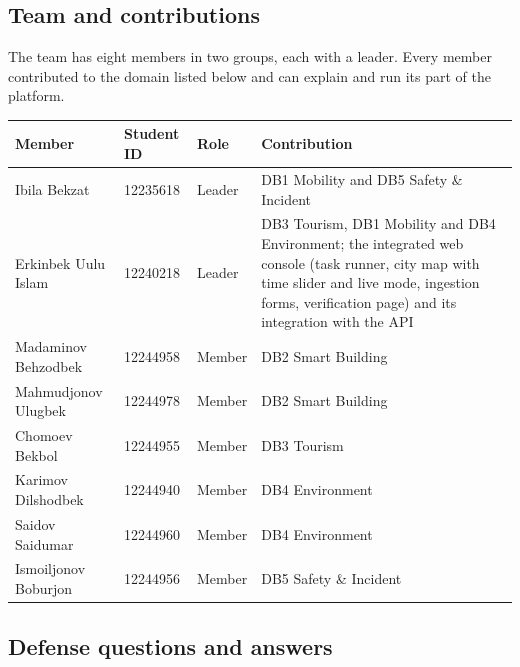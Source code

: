 \documentclass[11pt,a4paper]{article}
\begin{document}
\subsection{Team and contributions}

The team has eight members in two groups, each with a leader. Every member contributed to
the domain listed below and can explain and run its part of the platform.

\begin{center}\small
\begin{tabularx}{\linewidth}{@{}p{3.6cm}p{1.6cm}p{1.3cm}X@{}}
\toprule
Member & Student ID & Role & Contribution \\
\midrule
Ibila Bekzat & 12235618 & Leader & DB1 Mobility and DB5 Safety \& Incident \\
Erkinbek Uulu Islam & 12240218 & Leader & DB3 Tourism, DB1 Mobility and DB4 Environment; the integrated web console (task runner, city map with time slider and live mode, ingestion forms, verification page) and its integration with the API \\
Madaminov Behzodbek & 12244958 & Member & DB2 Smart Building \\
Mahmudjonov Ulugbek & 12244978 & Member & DB2 Smart Building \\
Chomoev Bekbol & 12244955 & Member & DB3 Tourism \\
Karimov Dilshodbek & 12244940 & Member & DB4 Environment \\
Saidov Saidumar & 12244960 & Member & DB4 Environment \\
Ismoiljonov Boburjon & 12244956 & Member & DB5 Safety \& Incident \\
\bottomrule
\end{tabularx}
\end{center}

\subsection{Defense questions and answers}
\end{document}
